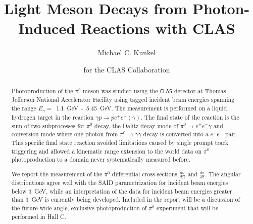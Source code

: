 \documentclass{aip-cp}
\begin{document}
\title{Light Meson Decays from Photon-Induced Reactions with CLAS}

\author[aff1]{Michael C. Kunkel}
\author[]{for the CLAS Collaboration }

\maketitle

\begin{abstract}
Photoproduction of the $\pi^0$ meson was studied using the \textsc{\texttt{CLAS}} detector at Thomas Jefferson National Accelerator Facility using tagged incident beam energies spanning the range $E_{\gamma}=$~1.1~GeV~-~5.45~GeV. The measurement is performed on a liquid hydrogen target in the reaction $\gamma p\to pe^+e^-(\gamma)$. The final state of the reaction is the sum of two subprocesses for $\pi^0$ decay, the Dalitz decay mode of $\pi^0\to e^+e^-\gamma$ and conversion mode where one photon from $\pi^0\to \gamma\gamma$ decay is converted into a $e^+e^-$ pair. This specific final state reaction avoided limitations caused by single prompt track triggering and allowed a kinematic range extension to the world data on $\pi^0$ photoproduction to a domain never systematically measured before.

We report the measurement of the $\pi^0$ differential cross-sections $\frac{d\sigma}{d\Omega}$ and $\frac{d\sigma}{dt}$. The angular distributions agree well with the SAID parametrization for incident beam energies below 3~GeV, while an interpretation of the data for incident beam energies greater than 3~GeV is currently being developed. Included in the report will be a discussion of the future wide angle, exclusive photoproduction of $\pi^0$ experiment that will be performed in Hall C.
\end{abstract}

\end{document}
